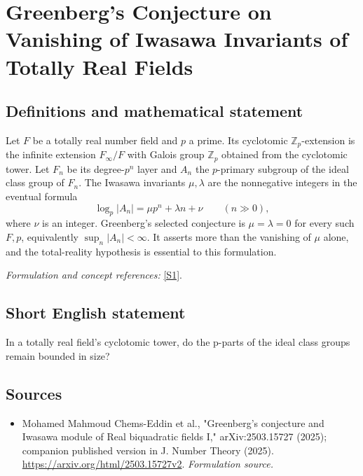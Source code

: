 \documentclass[11pt]{article}
\begin{document}
\section*{\texorpdfstring{Greenberg's Conjecture on Vanishing of Iwasawa Invariants of Totally Real Fields}{Greenberg's Conjecture on Vanishing of Iwasawa Invariants of Totally Real Fields}}\label{428}
\subsection{Definitions and mathematical statement}
Let $F$ be a totally real number field and $p$ a prime. Its cyclotomic ${\mathbb{Z}}_p$-extension is the infinite extension $F_\infty/F$ with Galois group ${\mathbb{Z}}_p$ obtained from the cyclotomic tower. Let $F_n$ be its degree-$p^n$ layer and $A_n$ the $p$-primary subgroup of the ideal class group of $F_n$. The Iwasawa invariants $\mu,\lambda$ are the nonnegative integers in the eventual formula
\[
 \log_p|A_n|=\mu p^n+\lambda n+\nu\qquad(n\gg0),
\]
where $\nu$ is an integer. Greenberg's selected conjecture is $\mu=\lambda=0$ for every such $F,p$, equivalently $\sup_n|A_n|<\infty$. It asserts more than the vanishing of $\mu$ alone, and the total-reality hypothesis is essential to this formulation.
\par\smallskip\textit{Formulation and concept references:} \href{https://arxiv.org/html/2503.15727v2}{[S1]}.

\subsection{Short English statement}
In a totally real field's cyclotomic tower, do the p-parts of the ideal class groups remain bounded in size?
\subsection{Sources}
\begin{itemize}
\item[S1]Mohamed Mahmoud Chems-Eddin et al., "Greenberg's conjecture and Iwasawa module of Real biquadratic fields I," arXiv:2503.15727 (2025); companion published version in J. Number Theory (2025).
\url{https://arxiv.org/html/2503.15727v2}.
\textit{Formulation source.}
\end{itemize}
\end{document}
